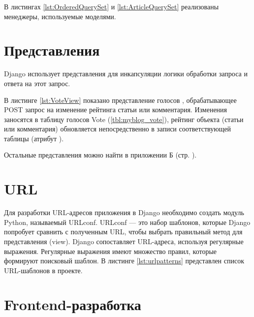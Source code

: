 В листингах \ref{lst:OrderedQuerySet} и \ref{lst:ArticleQuerySet} реализованы менеджеры, используемые моделями.





\section{Представления}

Django использует представления для инкапсуляции логики обработки запроса и ответа на этот запрос.

В листинге \ref{lst:VoteView} показано представление голосов , обрабатывающее POST запрос на изменение рейтинга статьи или комментария.
Изменения заносятся в таблицу голосов Vote (\ref{tbl:myblog_vote}), рейтинг объекта (статьи или комментария) обновляется непосредственно в записи соответствующей таблицы (атрибут ).



Остальные представления можно найти в приложении Б (стр. \pageref{chp:attachment-b}).

\section{URL}

Для разработки URL-адресов приложения в Django необходимо создать модуль Python, называемый URLconf.
URLconf — это набор шаблонов, которые Django попробует сравнить с полученным URL, чтобы выбрать правильный метод для представления (view).
Django сопоставляет URL-адреса, используя регулярные выражения.
Регулярные выражения имеют множество правил, которые формируют поисковый шаблон.
В листинге \ref{lst:urlpatterns} представлен список URL-шаблонов в проекте.



\section{Frontend-разработка}

